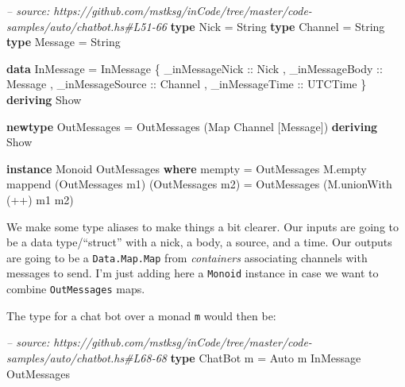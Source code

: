 \documentclass[]{article}
\newenvironment{Shaded}{}{}
\newcommand{\KeywordTok}[1]{\textcolor[rgb]{0.00,0.44,0.13}{\textbf{{#1}}}}
\newcommand{\DataTypeTok}[1]{\textcolor[rgb]{0.56,0.13,0.00}{{#1}}}
\newcommand{\CommentTok}[1]{\textcolor[rgb]{0.38,0.63,0.69}{\textit{{#1}}}}
\newcommand{\OtherTok}[1]{\textcolor[rgb]{0.00,0.44,0.13}{{#1}}}
\newcommand{\FunctionTok}[1]{\textcolor[rgb]{0.02,0.16,0.49}{{#1}}}
\newcommand{\NormalTok}[1]{{#1}}
\begin{document}
\begin{Shaded}
\begin{Highlighting}[]
\CommentTok{-- source: https://github.com/mstksg/inCode/tree/master/code-samples/auto/chatbot.hs#L51-66}
\KeywordTok{type} \DataTypeTok{Nick}    \FunctionTok{=} \DataTypeTok{String}
\KeywordTok{type} \DataTypeTok{Channel} \FunctionTok{=} \DataTypeTok{String}
\KeywordTok{type} \DataTypeTok{Message} \FunctionTok{=} \DataTypeTok{String}

\KeywordTok{data} \DataTypeTok{InMessage} \FunctionTok{=} \DataTypeTok{InMessage} \NormalTok{\{}\OtherTok{ _inMessageNick   ::} \DataTypeTok{Nick}
                           \NormalTok{,}\OtherTok{ _inMessageBody   ::} \DataTypeTok{Message}
                           \NormalTok{,}\OtherTok{ _inMessageSource ::} \DataTypeTok{Channel}
                           \NormalTok{,}\OtherTok{ _inMessageTime   ::} \DataTypeTok{UTCTime}
                           \NormalTok{\} }\KeywordTok{deriving} \DataTypeTok{Show}

\KeywordTok{newtype} \DataTypeTok{OutMessages} \FunctionTok{=} \DataTypeTok{OutMessages} \NormalTok{(}\DataTypeTok{Map} \DataTypeTok{Channel} \NormalTok{[}\DataTypeTok{Message}\NormalTok{]) }\KeywordTok{deriving} \DataTypeTok{Show}

\KeywordTok{instance} \DataTypeTok{Monoid} \DataTypeTok{OutMessages} \KeywordTok{where}
    \NormalTok{mempty  }\FunctionTok{=} \DataTypeTok{OutMessages} \NormalTok{M.empty}
    \NormalTok{mappend (}\DataTypeTok{OutMessages} \NormalTok{m1) (}\DataTypeTok{OutMessages} \NormalTok{m2)}
            \FunctionTok{=} \DataTypeTok{OutMessages} \NormalTok{(M.unionWith (}\FunctionTok{++}\NormalTok{) m1 m2)}
\end{Highlighting}
\end{Shaded}

We make some type aliases to make things a bit clearer. Our inputs are going to
be a data type/``struct'' with a nick, a body, a source, and a time. Our outputs
are going to be a \texttt{Data.Map.Map} from \emph{containers} associating
channels with messages to send. I'm just adding here a \texttt{Monoid} instance
in case we want to combine \texttt{OutMessages} maps.

The type for a chat bot over a monad \texttt{m} would then be:

\begin{Shaded}
\begin{Highlighting}[]
\CommentTok{-- source: https://github.com/mstksg/inCode/tree/master/code-samples/auto/chatbot.hs#L68-68}
\KeywordTok{type} \DataTypeTok{ChatBot} \NormalTok{m }\FunctionTok{=} \DataTypeTok{Auto} \NormalTok{m }\DataTypeTok{InMessage} \DataTypeTok{OutMessages}
\end{Highlighting}
\end{Shaded}
\end{document}
